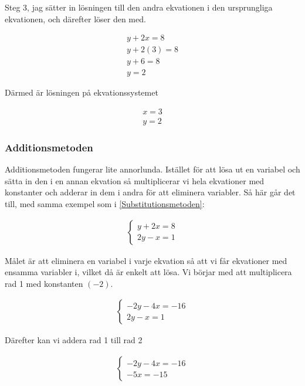 Steg 3, jag sätter in lösningen till den andra ekvationen i den ursprungliga ekvationen, och därefter löser den med.

\begin{align}
	y+2x = 8 \\
	y+2(3) = 8 \\
	y+6 = 8 \\
	y = 2
\end{align}

Därmed är lösningen på ekvationssystemet

\begin{align*}
	x = 3 \\
	y = 2
\end{align*}

\newpage
\subsubsection{Additionsmetoden}

Additionsmetoden fungerar lite annorlunda. Istället för att lösa ut en variabel och sätta in den i en annan ekvation så multiplicerar vi hela ekvationer med konstanter och adderar in dem i andra för att eliminera variabler. Så här går det till, med samma exempel som i \ref{Substitutionsmetoden}:

\begin{align}
	\begin{cases}
		y+2x=8 \\
		2y-x = 1
	\end{cases}
\end{align}

Målet är att eliminera en variabel i varje ekvation så att vi får ekvationer med ensamma variabler i, vilket då är enkelt att lösa. Vi börjar med att multiplicera rad 1 med konstanten $(-2)$.

\begin{align}
	\begin{cases}
		-2y-4x=-16 \\
		2y-x = 1
	\end{cases}
\end{align}

Därefter kan vi addera rad 1 till rad 2

\begin{align}
	\begin{cases}
		-2y-4x=-16 \\
		-5x = -15
	\end{cases}
\end{align}

